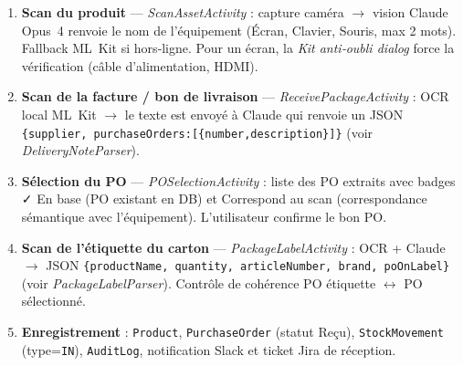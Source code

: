 \documentclass[11pt,a4paper]{article}
\begin{document}
\begin{enumerate}
  \item \textbf{Scan du produit} — \emph{ScanAssetActivity} :
        capture caméra $\rightarrow$ vision Claude Opus~4 renvoie le nom de
        l'équipement (\og Écran\fg{}, \og Clavier\fg{}, \og Souris\fg{}, max
        2 mots). Fallback ML~Kit si hors‑ligne. Pour un écran, la
        \emph{Kit anti‑oubli dialog} force la vérification (câble
        d'alimentation, HDMI).
  \item \textbf{Scan de la facture / bon de livraison} — \emph{ReceivePackageActivity} :
        OCR local ML~Kit $\rightarrow$ le texte est envoyé à Claude qui
        renvoie un JSON \texttt{\{supplier, purchaseOrders:[\{number,description\}]\}}
        (voir \emph{DeliveryNoteParser}).
  \item \textbf{Sélection du PO} — \emph{POSelectionActivity} :
        liste des PO extraits avec badges \og\faCheck{} En base\fg{} (PO
        existant en DB) et \og\faBullseye{} Correspond au scan\fg{}
        (correspondance sémantique avec l'équipement). L'utilisateur
        confirme le bon PO.
  \item \textbf{Scan de l'étiquette du carton} — \emph{PackageLabelActivity} :
        OCR + Claude $\rightarrow$ JSON
        \texttt{\{productName, quantity, articleNumber, brand, poOnLabel\}}
        (voir \emph{PackageLabelParser}). Contrôle de cohérence PO
        étiquette $\leftrightarrow$ PO sélectionné.
  \item \textbf{Enregistrement} : \texttt{Product}, \texttt{PurchaseOrder}
        (statut \og Reçu\fg{}), \texttt{StockMovement} (type=\texttt{IN}),
        \texttt{AuditLog}, notification Slack et ticket Jira de réception.
\end{enumerate}

\begin{center}\vspace{-4pt}
\vspace{-4pt}
\end{center}
\end{document}
